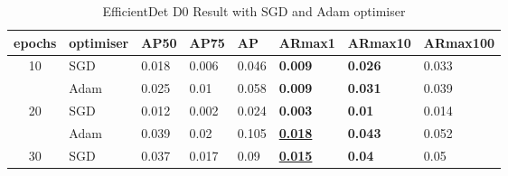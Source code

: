 \documentclass{article}
\begin{document}
\begin{table}
\centering
\setlength{\extrarowheight}{0pt}
\addtolength{\extrarowheight}{\aboverulesep}
\addtolength{\extrarowheight}{\belowrulesep}
\setlength{\aboverulesep}{0pt}
\setlength{\belowrulesep}{0pt}
\caption{EfficientDet D0 Result with SGD and Adam optimiser}
\begin{tabular}{cl|llllll} 
\toprule
\multicolumn{1}{l}{epochs} & optimiser                               & AP50                                      & AP75                                      & AP                                                 & ARmax1                                                     & ARmax10                                            & ARmax100                                            \\ 
\hline
\multirow{2}{*}{10}        & {\cellcolor[rgb]{0.788,0.788,0.788}}SGD & {\cellcolor[rgb]{0.788,0.788,0.788}}0.018 & {\cellcolor[rgb]{0.788,0.788,0.788}}0.006 & {\cellcolor[rgb]{0.788,0.788,0.788}}0.046          & {\cellcolor[rgb]{0.788,0.788,0.788}}\textbf{0.009}         & {\cellcolor[rgb]{0.788,0.788,0.788}}\textbf{0.026} & {\cellcolor[rgb]{0.788,0.788,0.788}}0.033           \\
                           & Adam                                    & 0.025                                     & 0.01                                      & 0.058                                              & \textbf{0.009}                                             & \textbf{0.031}                                     & 0.039                                               \\
\multirow{2}{*}{20}        & {\cellcolor[rgb]{0.788,0.788,0.788}}SGD & {\cellcolor[rgb]{0.788,0.788,0.788}}0.012 & {\cellcolor[rgb]{0.788,0.788,0.788}}0.002 & {\cellcolor[rgb]{0.788,0.788,0.788}}0.024          & {\cellcolor[rgb]{0.788,0.788,0.788}}\textbf{0.003}         & {\cellcolor[rgb]{0.788,0.788,0.788}}\textbf{0.01}  & {\cellcolor[rgb]{0.788,0.788,0.788}}0.014           \\
                           & Adam                                    & 0.039                                     & 0.02                                      & 0.105                                              & \textbf{\uline{0.018}}                                     & \textbf{0.043}                                     & 0.052                                               \\
\multirow{2}{*}{30}        & {\cellcolor[rgb]{0.788,0.788,0.788}}SGD & {\cellcolor[rgb]{0.788,0.788,0.788}}0.037 & {\cellcolor[rgb]{0.788,0.788,0.788}}0.017 & {\cellcolor[rgb]{0.788,0.788,0.788}}0.09           & {\cellcolor[rgb]{0.788,0.788,0.788}}\textbf{\uline{0.015}} & {\cellcolor[rgb]{0.788,0.788,0.788}}\textbf{0.04}  & {\cellcolor[rgb]{0.788,0.788,0.788}}0.05            \\

\end{tabular}
\end{table}
\end{document}
